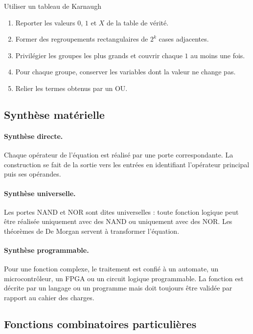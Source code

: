 \begin{TLLogicMethod}{Utiliser un tableau de Karnaugh}
\begin{enumerate}
  \item Reporter les valeurs $0$, $1$ et $X$ de la table de vérité.
  \item Former des regroupements rectangulaires de $2^k$ cases adjacentes.
  \item Privilégier les groupes les plus grands et couvrir chaque $1$ au moins une fois.
  \item Pour chaque groupe, conserver les variables dont la valeur ne change pas.
  \item Relier les termes obtenus par un OU.
\end{enumerate}
\end{TLLogicMethod}

\subsection{Synthèse matérielle}

\paragraph{Synthèse directe.}
Chaque opérateur de l'équation est réalisé par une porte correspondante. La construction se fait de la sortie vers les entrées en identifiant l'opérateur principal puis ses opérandes.

\paragraph{Synthèse universelle.}
Les portes NAND et NOR sont dites universelles : toute fonction logique peut être réalisée uniquement avec des NAND ou uniquement avec des NOR. Les théorèmes de De Morgan servent à transformer l'équation.

\paragraph{Synthèse programmable.}
Pour une fonction complexe, le traitement est confié à un automate, un microcontrôleur, un FPGA ou un circuit logique programmable. La fonction est décrite par un langage ou un programme mais doit toujours être validée par rapport au cahier des charges.

\subsection{Fonctions combinatoires particulières}

